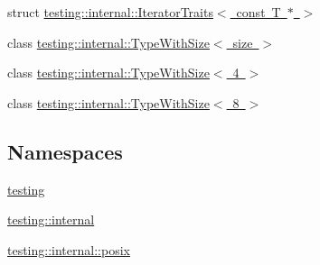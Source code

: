 \begin{DoxyCompactItemize}
\item 
struct \mbox{\hyperlink{structtesting_1_1internal_1_1_iterator_traits_3_01const_01_t_01_5_01_4}{testing\+::internal\+::\+Iterator\+Traits$<$ const T $\ast$ $>$}}
\item 
class \mbox{\hyperlink{classtesting_1_1internal_1_1_type_with_size}{testing\+::internal\+::\+Type\+With\+Size$<$ size $>$}}
\item 
class \mbox{\hyperlink{classtesting_1_1internal_1_1_type_with_size_3_014_01_4}{testing\+::internal\+::\+Type\+With\+Size$<$ 4 $>$}}
\item 
class \mbox{\hyperlink{classtesting_1_1internal_1_1_type_with_size_3_018_01_4}{testing\+::internal\+::\+Type\+With\+Size$<$ 8 $>$}}
\end{DoxyCompactItemize}
\subsection*{Namespaces}
\begin{DoxyCompactItemize}
\item 
 \mbox{\hyperlink{namespacetesting}{testing}}
\item 
 \mbox{\hyperlink{namespacetesting_1_1internal}{testing\+::internal}}
\item 
 \mbox{\hyperlink{namespacetesting_1_1internal_1_1posix}{testing\+::internal\+::posix}}
\end{DoxyCompactItemize}
